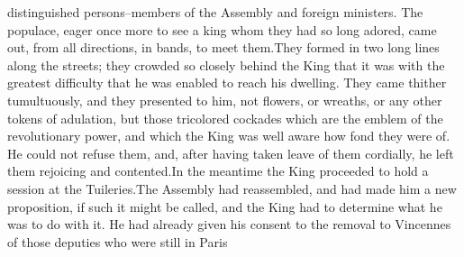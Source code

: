 \documentclass[a4paper]{article}
\begin{document}
distinguished persons--members of the Assembly and foreign ministers. The populace, eager once more to see a king whom they had so long adored, came out, from all directions, in bands, to meet them.They formed in two long lines along the streets; they crowded so closely behind the King that it was with the greatest difficulty that he was enabled to reach his dwelling. They came thither tumultuously, and they presented to him, not flowers, or wreaths, or any other tokens of adulation, but those tricolored cockades which are the emblem of the revolutionary power, and which the King was well aware how fond they were of. He could not refuse them, and, after having taken leave of them cordially, he left them rejoicing and contented.In the meantime the King proceeded to hold a session at the Tuileries.The Assembly had reassembled, and had made him a new proposition, if such it might be called, and the King had to determine what he was to do with it. He had already given his consent to the removal to Vincennes of those deputies who were still in Paris
\end{document}
